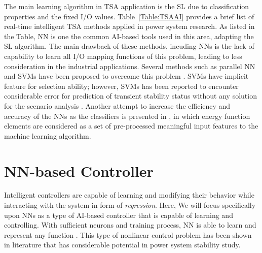 \documentclass[journal]{IEEEtran}
\begin{document}
The main learning algorithm in TSA application is the SL due to classification properties and the fixed I/O values. Table~\ref{Table:TSAAI} provides a brief list of real-time intelligent TSA methods applied in power system research. As listed in the Table, NN is one the common AI-based tools used in this area, adapting the SL algorithm. The main drawback of these methods, incuding NNs is the lack of capability to learn all I/O mapping functions of this problem, leading to less consideration in the industrial applications. Several methods such as parallel NN and SVMs have been proposed to overcome this problem \cite{4282006, 1338527}. SVMs have implicit feature for selection ability; however, SVMs has been reported to encounter considerable error for prediction of transient stability status without any solution for the scenario analysis \cite{4282006}. Another attempt to increase the efficiency and accuracy of the NNs as the classifiers is presented in \cite{6902826}, in which energy function elements are considered as a set of pre-processed meaningful input features to the machine learning algorithm. 


\section{NN-based Controller}
Intelligent controllers are capable of learning and modifying their behavior while interacting with the system in form of \textit{regression}. Here, We will focus specifically upon NNs as a type of AI-based controller that is capable of learning and controlling. With sufficient neurons and training process, NN is able to learn and represent any function \cite{Sobajic1989}. 
This type of nonlinear control problem has been shown in literature that has considerable potential in power system  stability study. 
\end{document}
